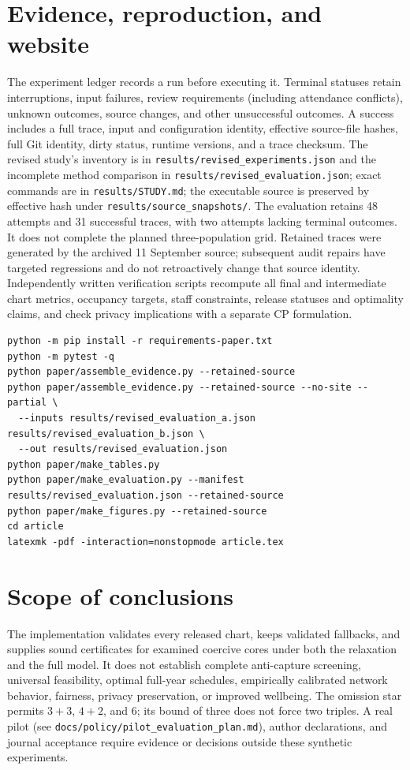 \documentclass[11pt,a4paper]{article}
\begin{document}
\section{Evidence, reproduction, and website}
The experiment ledger records a run before executing it. Terminal statuses retain interruptions, input failures, review requirements (including attendance conflicts), unknown outcomes, source changes, and other unsuccessful outcomes. A success includes a full trace, input and configuration identity, effective source-file hashes, full Git identity, dirty status, runtime versions, and a trace checksum. The revised study's inventory is in \texttt{results/revised\_experiments.json} and the incomplete method comparison in \texttt{results/revised\_evaluation.json}; exact commands are in \texttt{results/STUDY.md}; the executable source is preserved by effective hash under \texttt{results/source\_snapshots/}. The evaluation retains 48 attempts and 31 successful traces, with two attempts lacking terminal outcomes. It does not complete the planned three-population grid. Retained traces were generated by the archived 11 September source; subsequent audit repairs have targeted regressions and do not retroactively change that source identity. Independently written verification scripts recompute all final and intermediate chart metrics, occupancy targets, staff constraints, release statuses and optimality claims, and check privacy implications with a separate CP formulation.

\begin{lstlisting}[basicstyle=\ttfamily\small,breaklines=true]
python -m pip install -r requirements-paper.txt
python -m pytest -q
python paper/assemble_evidence.py --retained-source
python paper/assemble_evidence.py --retained-source --no-site --partial \
  --inputs results/revised_evaluation_a.json results/revised_evaluation_b.json \
  --out results/revised_evaluation.json
python paper/make_tables.py
python paper/make_evaluation.py --manifest results/revised_evaluation.json --retained-source
python paper/make_figures.py --retained-source
cd article
latexmk -pdf -interaction=nonstopmode article.tex
\end{lstlisting}

\section{Scope of conclusions}
The implementation validates every released chart, keeps validated fallbacks, and supplies sound certificates for examined coercive cores under both the relaxation and the full model. It does not establish complete anti-capture screening, universal feasibility, optimal full-year schedules, empirically calibrated network behavior, fairness, privacy preservation, or improved wellbeing. The omission star permits $3+3$, $4+2$, and $6$; its bound of three does not force two triples. A real pilot (see \texttt{docs/policy/pilot\_evaluation\_plan.md}), author declarations, and journal acceptance require evidence or decisions outside these synthetic experiments.
\end{document}
